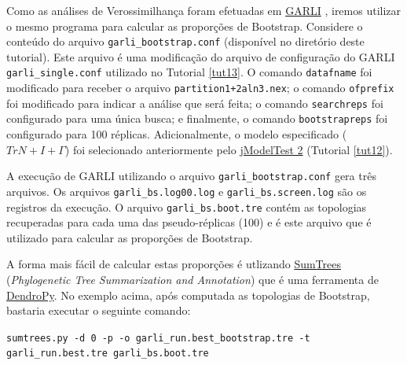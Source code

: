 \begin{refsection}
Como as análises de Verossimilhança foram efetuadas em \href{https://www.nescent.org/wg_garli/Main_Page}{GARLI} \parencite[][]{Zwickl_2006}, iremos utilizar o mesmo programa para calcular as proporções de Bootstrap. Considere o conteúdo do arquivo \texttt{garli\_bootstrap.conf} (disponível no diretório deste tutorial). Este arquivo é uma modificação do arquivo de configuração do GARLI \texttt{garli\_single.conf} utilizado no Tutorial \ref{tut13}. O comando \texttt{datafname} foi modificado para receber o arquivo \texttt{partition1+2aln3.nex}; o comando \texttt{ofprefix} foi modificado para indicar a análise que será feita; o comando \texttt{searchreps} foi configurado para uma única busca; e finalmente, o comando \texttt{bootstrapreps} foi configurado para 100 réplicas. Adicionalmente, o modelo especificado ($TrN+I+\Gamma$) foi selecionado anteriormente pelo \href{http://code.google.com/p/jmodeltest2/}{jModelTest 2} (Tutorial \ref{tut12}).

A execução de GARLI utilizando o arquivo \texttt{garli\_bootstrap.conf} gera três arquivos. Os arquivos \texttt{garli\_bs.log00.log} e \texttt{garli\_bs.screen.log} são os registros da execução. O arquivo \texttt{garli\_bs.boot.tre} contém as topologias recuperadas para cada uma das pseudo-réplicas (100) e é este arquivo que é utilizado para calcular as proporções de Bootstrap.

A forma mais fácil de calcular estas proporções é utlizando \href{https://pythonhosted.org/DendroPy/programs/sumtrees.html}{SumTrees} (\textit{Phylogenetic Tree Summarization and Annotation}) que é uma ferramenta de \href{https://pythonhosted.org/DendroPy/}{DendroPy}. No exemplo acima, após computada as topologias de Bootstrap, bastaria executar o seguinte comando:\\

\scriptsize
\begin{center}
\texttt{sumtrees.py -d 0 -p -o garli\_run.best\_bootstrap.tre -t garli\_run.best.tre garli\_bs.boot.tre}\\    
\end{center}

\normalsize



\end{refsection}
